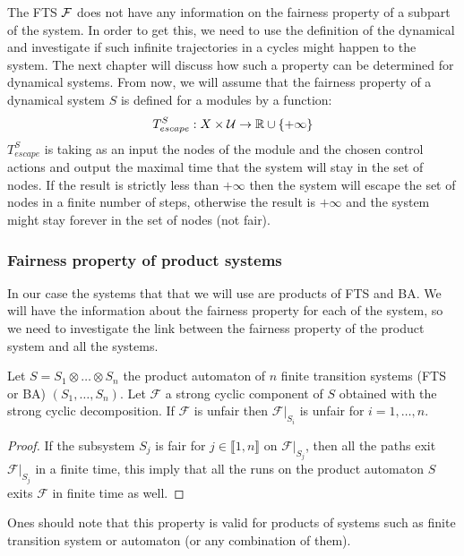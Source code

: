 The FTS $\mathcal{F}$ does not have any information on the fairness property of a subpart of the system. In order to get this, we need to use the definition of the dynamical and investigate if such infinite trajectories in a cycles might happen to the system.
The next chapter will discuss how such a property can be determined for dynamical systems.
From now, we will assume that the fairness property of a dynamical system $S$ is defined for a modules by a function:
\newcommand{\Tesc}{T_{escape}^S}%
\begin{equation}
\Tesc:X \times \U \rightarrow \R \cup \{+\infty\}
\end{equation}
$\Tesc$ is taking as an input the nodes of the module and the chosen control actions and output the maximal time that the system will stay in the set of nodes. If the result is strictly less than $+\infty$ then the system will escape the set of nodes in a finite number of steps, otherwise the result is $+\infty$ and the system might stay forever in the set of nodes (not fair).

\subsubsection{Fairness property of product systems}
In our case the systems that that we will use are products of FTS and BA. We will have the information about the fairness property for each of the system, so we need to investigate the link between the fairness property of the product system and all the systems.

\begin{prop}
Let $S = S_1 \otimes \dots \otimes S_n$ the product automaton of $n$ finite transition systems (FTS or BA) $(S_1,\dots,S_n)$.
Let $\mathcal{F}$ a strong cyclic component of $S$ obtained with the strong cyclic decomposition.
If $\mathcal{F}$ is unfair then $\mathcal{F}|_{S_i}$ is unfair for $i = 1,\dots,n$.
\end{prop}

\begin{proof}
If the subsystem $S_j$ is fair for $j \in \llbracket 1,n \rrbracket$ on $\mathcal{F}|_{S_j}$, then all the paths exit $\mathcal{F}|_{S_j}$ in a finite time, this imply that all the runs on the product automaton $S$ exits $\mathcal{F}$ in finite time as well.
\end{proof}

Ones should note that this property is valid for products of systems such as finite transition system or \buchi{} automaton (or any combination of them).


